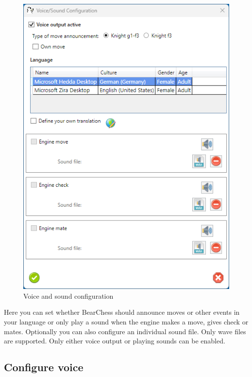 \documentclass[11pt,a4paper]{article}
\begin{document}
	\begin{figure}[H]
		\centering
		\includegraphics[scale=1.0]{Sounds1.png}
		\caption{Voice and sound configuration}
		\label{fig:Sounds1}
	\end{figure}	
	
	Here you can set whether BearChess should announce moves or other events in your language or only play a sound when the engine makes a move, gives check or mates. Optionally you can also configure an individual sound file. Only wave files are supported. Only either voice output or playing sounds can be enabled.
	
	\subsection{Configure voice}
	
\end{document}
